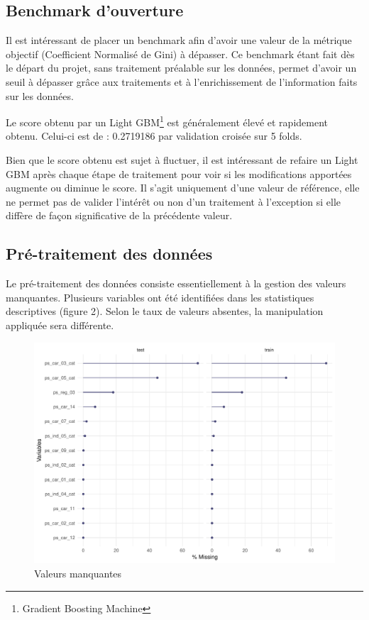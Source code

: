 \documentclass[french]{article}
\begin{document}
\begin{multicols}{2}
\subsection{Benchmark d'ouverture}

Il est intéressant de placer un benchmark afin d'avoir une valeur de la métrique objectif (Coefficient Normalisé de Gini) à dépasser. Ce benchmark étant fait dès le départ du projet, sans traitement préalable sur les données, permet d'avoir un seuil à dépasser grâce aux traitements et à l'enrichissement de l'information faits sur les données.

Le score obtenu par un Light GBM\footnote{Gradient Boosting Machine} est généralement élevé et rapidement obtenu. Celui-ci est de : 0.2719186 par validation croisée sur 5 folds.

Bien que le score obtenu est sujet à fluctuer, il est intéressant de refaire un Light GBM après chaque étape de traitement pour voir si les modifications apportées augmente ou diminue le score. Il s'agit uniquement d'une valeur de référence, elle ne permet pas de valider l'intérêt ou non d'un traitement à l'exception si elle diffère de façon significative de la précédente valeur.


\subsection{Pré-traitement des données}

Le pré-traitement des données consiste essentiellement à la gestion des valeurs manquantes. Plusieurs variables ont été identifiées dans les statistiques descriptives (figure 2). Selon le taux de valeurs absentes, la manipulation appliquée sera différente. 

\begin{figure}[H] \centering
  \includegraphics[width = \columnwidth]{img/missing_values}
  \caption{Valeurs manquantes}
\end{figure}



\end{multicols}
\end{document}
